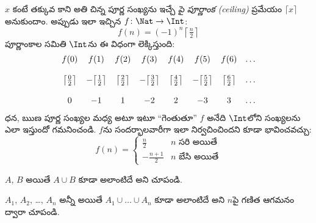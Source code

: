 \documentclass[../../../include/open-logic-section]{subfiles}
\begin{document}
\begin{ex}
$x$ కంటే తక్కువ కాని అతి చిన్న పూర్ణ సంఖ్యను ఇచ్చే
\emph{పై పూర్ణాంక (ceiling)} ప్రమేయం $\lceil x \rceil$ అనుకుందాం. అప్పుడు ఇలా
ఇచ్చిన $f \colon \Nat \to \Int$:
\[
  f(n) = (-1)^{n} \left\lceil\tfrac{n}{2}\right\rceil
\]
పూర్ణాంకాల సమితి $\Int$ను ఈ విధంగా లెక్కిస్తుంది:
\[
\begin{array}{c c c c c c c c}
f(0) & f(1) & f(2) & f(3) & f(4) & f(5) & f(6) & \dots \\ \\
\big\lceil \tfrac{0}{2} \big\rceil & -\big\lceil \tfrac{1}{2}\big\rceil &  \big\lceil \tfrac{2}{2} \big\rceil & -\big\lceil \tfrac{3}{2} \big\rceil & \big\lceil \tfrac{4}{2} \big\rceil  & -\big\lceil \tfrac{5}{2}\big\rceil & \big\lceil \tfrac{6}{2} \big\rceil & \dots \\ \\
0 & -1 & 1 & -2 & 2 & -3 & 3& \dots
\end{array}
\]
ధన, ఋణ పూర్ణ సంఖ్యల మధ్య అటూ ఇటూ ``గెంతుతూ'' $f$ అనేది $\Int$లోని సంఖ్యలను
ఎలా ఇస్తుందో గమనించండి. $f$ను సందర్భాలవారీగా ఇలా
నిర్వచించిందని కూడా భావించవచ్చు:
\[
f(n) = \begin{cases}
  \frac{n}{2} & \text{$n$ సరి అయితే}\\
  -\frac{n+1}{2} & \text{$n$ బేసి అయితే}
  \end{cases}
\]
\end{ex}

\begin{prob}
$A$, $B$  అయితే $A \cup B$ కూడా అలాంటిదే అని చూపండి.
\end{prob}

\begin{prob}
$A_1$, $A_2$, \dots, $A_n$ అన్నీ  అయితే
$A_1 \cup \dots \cup A_n$ కూడా అలాంటిదే అని $n$పై గణిత ఆగమనం
ద్వారా చూపండి.
\end{prob}
\end{document}
